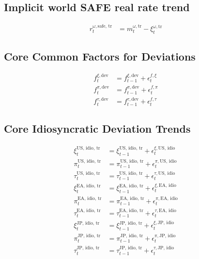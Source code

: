 \documentclass{article}
\begin{document}
\subsection*{Implicit world SAFE real rate trend}
\begin{align}
    r^{\omega, \text{safe, tr}}_t &= m^{\omega, \text{tr}}_t - \xi^{\omega, \text{tr}}_t %
\end{align}

\subsection*{Core Common Factors for Deviations}
\begin{align}
    f^{\xi, \text{dev}}_t &= f^{\xi, \text{dev}}_{t-1} + \epsilon^{f, \xi}_t \\
    f^{\pi, \text{dev}}_t &= f^{\pi, \text{dev}}_{t-1} + \epsilon^{f, \pi}_t \\
    f^{\tau, \text{dev}}_t &= f^{\tau, \text{dev}}_{t-1} + \epsilon^{f, \tau}_t
\end{align}

\subsection*{Core Idiosyncratic Deviation Trends}
\begin{align}
    \xi^{\text{US, idio, tr}}_t &= \xi^{\text{US, idio, tr}}_{t-1} + \epsilon^{\xi, \text{US, idio}}_t \\
    \pi^{\text{US, idio, tr}}_t &= \pi^{\text{US, idio, tr}}_{t-1} + \epsilon^{\pi, \text{US, idio}}_t \\
    \tau^{\text{US, idio, tr}}_t &= \tau^{\text{US, idio, tr}}_{t-1} + \epsilon^{\tau, \text{US, idio}}_t \\
    \xi^{\text{EA, idio, tr}}_t &= \xi^{\text{EA, idio, tr}}_{t-1} + \epsilon^{\xi, \text{EA, idio}}_t \\
    \pi^{\text{EA, idio, tr}}_t &= \pi^{\text{EA, idio, tr}}_{t-1} + \epsilon^{\pi, \text{EA, idio}}_t \\
    \tau^{\text{EA, idio, tr}}_t &= \tau^{\text{EA, idio, tr}}_{t-1} + \epsilon^{\tau, \text{EA, idio}}_t \\
    \xi^{\text{JP, idio, tr}}_t &= \xi^{\text{JP, idio, tr}}_{t-1} + \epsilon^{\xi, \text{JP, idio}}_t \\
    \pi^{\text{JP, idio, tr}}_t &= \pi^{\text{JP, idio, tr}}_{t-1} + \epsilon^{\pi, \text{JP, idio}}_t \\
    \tau^{\text{JP, idio, tr}}_t &= \tau^{\text{JP, idio, tr}}_{t-1} + \epsilon^{\tau, \text{JP, idio}}_t
\end{align}
\end{document}
